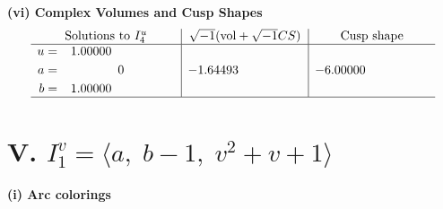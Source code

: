 \documentclass[1p]{elsarticle_modified}
\theoremstyle{definition}
\newcommand{\I}{\sqrt{-1}}
\begin{document}
\newpage\flushleft \textbf{(vi) Complex Volumes and Cusp Shapes}
$$\begin{array}{c|c|c}  
\text{Solutions to }I^u_{4}& \I (\text{vol} + \sqrt{-1}CS) & \text{Cusp shape}\\
 \hline 
\begin{aligned}
u &= \phantom{-}1.00000\phantom{ +0.000000I} \\
a &= \phantom{-0.000000 } 0 \\
b &= \phantom{-}1.00000\phantom{ +0.000000I}\end{aligned}
 & -1.64493\phantom{ +0.000000I} & -6.00000\phantom{ +0.000000I}\\
 \hline 
 \end{array}$$\newpage\newpage\renewcommand{\arraystretch}{1}
\centering \section*{V. $I^v_{1}= \langle a,\;b-1,\;v^2+v+1 \rangle$}
\flushleft \textbf{(i) Arc colorings}\\
\end{document}
